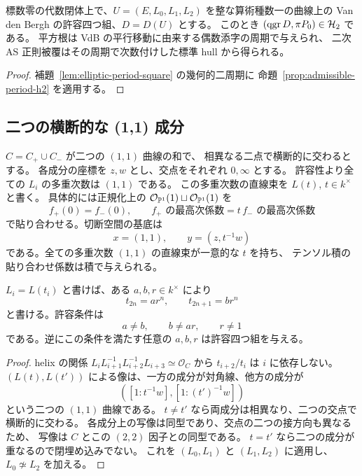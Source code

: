 \begin{theorem}[整な楕円四つ組からの対象]
\label{thm:integral-elliptic-inverse}
標数零の代数閉体上で、$U=(E,L_0,L_1,L_2)$ を整な算術種数一の曲線上の
Van den Bergh の許容四つ組、$D=D(U)$ とする。
このとき $(\operatorname{qgr} D,\pi P_0)\in\mathcal H_2$ である。
平方根は VdB の平行移動に由来する偶数添字の周期で与えられ、
二次 AS 正則被覆はその周期で次数付けした標準 hull から得られる。
\end{theorem}

\begin{proof}
補題~\ref{lem:elliptic-period-square} の幾何的二周期に
命題~\ref{prop:admissible-period-h2} を適用する。
\end{proof}

\subsection{二つの横断的な (1,1) 成分}

$C=C_+\cup C_-$ が二つの $(1,1)$ 曲線の和で、
相異なる二点で横断的に交わるとする。
各成分の座標を $z,w$ とし、交点をそれぞれ $0,\infty$ とする。
許容性より全ての $L_i$ の多重次数は $(1,1)$ である。
この多重次数の直線束を $L(t)$, $t\in k^\times$ と書く。
具体的には正規化上の $\mathcal O_{\mathbb P^1}(1)\sqcup\mathcal O_{\mathbb P^1}(1)$ を
\[
 f_+(0)=f_-(0),\qquad
 \text{$f_+$ の最高次係数}=t\,\text{$f_-$ の最高次係数}
\]
で貼り合わせる。切断空間の基底は
\[
 x=(1,1),\qquad y=(z,t^{-1}w)
\]
である。全ての多重次数 $(1,1)$ の直線束が一意的な $t$ を持ち、
テンソル積の貼り合わせ係数は積で与えられる。

\begin{lemma}[許容四つ組のパラメータ]
\label{lem:i2-parameters}
$L_i=L(t_i)$ と書けば、ある $a,b,r\in k^\times$ により
\[
 t_{2n}=ar^n,\qquad t_{2n+1}=br^n
\]
と書ける。許容条件は
\[
 a\ne b,\qquad b\ne ar,\qquad r\ne1
\]
である。逆にこの条件を満たす任意の $a,b,r$ は許容四つ組を与える。
\end{lemma}

\begin{proof}
helix の関係 $L_iL_{i+1}^{-1}L_{i+2}^{-1}L_{i+3}\simeq\mathcal O_C$
から $t_{i+2}/t_i$ は $i$ に依存しない。
$(L(t),L(t'))$ による像は、一方の成分が対角線、他方の成分が
\[
 ([1:t^{-1}w],[1:(t')^{-1}w])
\]
という二つの $(1,1)$ 曲線である。
$t\ne t'$ なら両成分は相異なり、二つの交点で横断的に交わる。
各成分上の写像は同型であり、交点の二つの接方向も異なるため、
写像は $C$ とこの $(2,2)$ 因子との同型である。
$t=t'$ なら二つの成分が重なるので閉埋め込みでない。
これを $(L_0,L_1)$ と $(L_1,L_2)$ に適用し、$L_0\not\simeq L_2$ を加える。
\end{proof}

